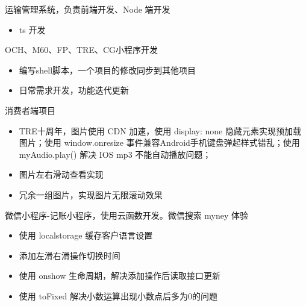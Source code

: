 \documentclass{resume}
\begin{document}
\begin{onehalfspacing}
运输管理系统，负责前端开发、Node 端开发
\begin{itemize}
  \item ts 开发
\end{itemize}
\end{onehalfspacing}

\begin{onehalfspacing}
OCH、M60、FP、TRE、CG小程序开发
\begin{itemize}
  \item 编写shell脚本，一个项目的修改同步到其他项目
  \item 日常需求开发，功能迭代更新
\end{itemize}
\end{onehalfspacing}

\newpage

\begin{onehalfspacing}
消费者端项目
\begin{itemize}
  \item TRE十周年，图片使用 CDN 加速，使用 display: none 隐藏元素实现预加载图片；使用 window.onresize 事件兼容Android手机键盘弹起样式错乱；使用 myAudio.play() 解决 IOS mp3 不能自动播放问题；
  \item 图片左右滑动查看实现
  \item 冗余一组图片，实现图片无限滚动效果
\end{itemize}
\end{onehalfspacing}

\begin{onehalfspacing}
微信小程序-记账小程序，使用云函数开发。微信搜索 myney 体验
\begin{itemize}
  \item 使用 localstorage 缓存客户语言设置
  \item 添加左滑右滑操作切换时间
  \item 使用 onshow 生命周期，解决添加操作后读取接口更新
  \item 使用 toFixed 解决小数运算出现小数点后多为0的问题
\end{itemize}
\end{onehalfspacing}
\end{document}

